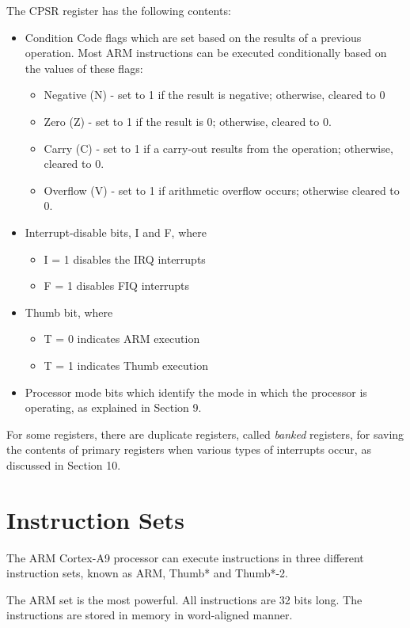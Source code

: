 \documentclass[11pt, twoside, pdftex]{article}
\begin{document}
The CPSR register has the following contents:
\begin{itemize}
\item Condition Code flags which are set based on the results
of a previous operation. Most ARM instructions can be executed
conditionally based on the values of these flags:
\begin{itemize}
\item Negative (N) - set to 1 if the result is negative;
otherwise, cleared to 0
\item Zero (Z) - set to 1 if the result is 0; otherwise,
cleared to 0.
\item Carry (C) - set to 1 if a carry-out results from the
operation; otherwise, cleared to 0.
\item Overflow (V) - set to 1 if arithmetic overflow occurs;
otherwise cleared to 0.
\end{itemize}
\item Interrupt-disable bits, I and F, where
\begin{itemize}
\item I = 1 disables the IRQ interrupts
\item F = 1 disables FIQ interrupts
\end{itemize}
\item Thumb bit, where
\begin{itemize}
\item T = 0 indicates ARM execution
\item T = 1 indicates Thumb execution
\end{itemize}
\item Processor mode bits which identify the mode in which
the processor is operating, as explained in Section 9.
\end{itemize}
 
For some registers, there are duplicate registers, called
{\it banked} registers, for saving 
the contents of primary registers when various types of
interrupts occur, as discussed in Section 10.

\section{Instruction Sets}
\label{sec:inst}

The ARM Cortex-A9 processor can execute instructions in three
different instruction sets, known as ARM, Thumb* and Thumb*-2.

The ARM set is the most powerful. All instructions
are 32 bits long. The instructions are stored in memory in
word-aligned manner.
\end{document}
